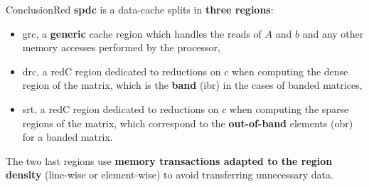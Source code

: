 \begin{highlight}{Conclusion}{Red}
    \textbf{\acrlong{spdc}} is a data-cache splits in \textbf{three regions}:
    \begin{itemize}
        \item \acrshort{grc}, a \textbf{generic} cache region which handles the reads of $A$ and $b$ and any other memory accesses performed by the processor,
        \item \acrshort{drc}, a \gls{redC} region dedicated to \glspl{reduction} on $c$ when computing the dense region of the matrix, which is the \textbf{\gls{band}} (\acrshort{ibr}) in the cases of \gls{banded} matrices,
        \item \acrshort{srt}, a \gls{redC} region dedicated to \glspl{reduction} on $c$ when computing the sparse regions of the matrix, which correspond to the \textbf{out-of-band} elements (\acrshort{obr}) for a \gls{banded} matrix.
    \end{itemize}
    The two last regions use \textbf{memory transactions adapted to the region density} (line-wise or element-wise) to avoid transferring unnecessary data.
\end{highlight}